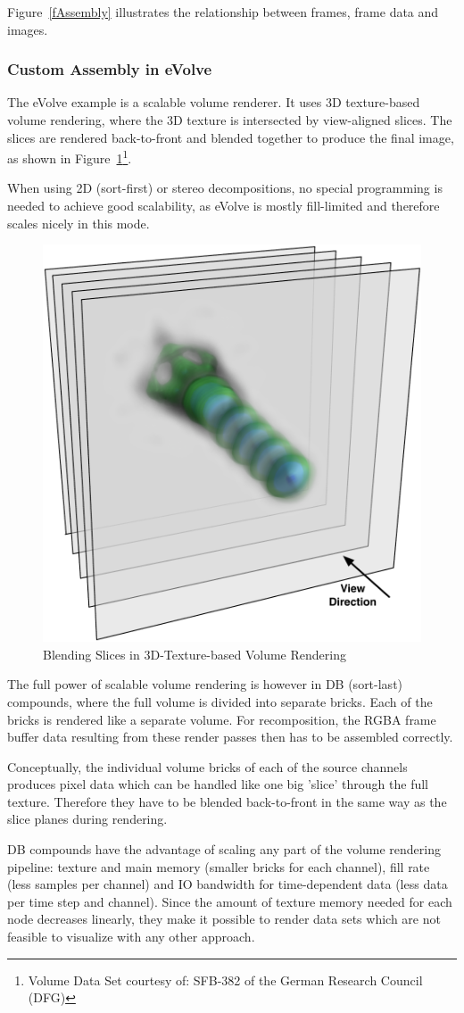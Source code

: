 \documentclass[10pt,a4]{scrartcl}
\newcommand{\fig}[1]{Figure~\ref{#1}}
\begin{document}
\fig{fAssembly} illustrates the relationship between frames, frame data
and images.

\subsubsection{Custom Assembly in eVolve}

The \textsf{eVolve} example is a scalable volume renderer. It uses 3D
texture-based volume rendering, where the 3D texture is intersected by
view-aligned slices. The slices are rendered back-to-front and blended
together to produce the final image, as shown in
\fig{fSlices}\footnote{Volume Data Set courtesy of: SFB-382 of the German
  Research Council (DFG)}.

When using 2D (sort-first) or stereo decompositions, no special
programming is needed to achieve good scalability, as \textsf{eVolve} is
mostly fill-limited and therefore scales nicely in this mode. 

\begin{figure}
  \includegraphics[width=.382\textwidth]{images/slices.pdf}
  {\caption{\small\label{fSlices}Blending Slices in 3D-Texture-based
      Volume Rendering}}
\end{figure}
The full power of scalable volume rendering is however in DB (sort-last)
compounds, where the full volume is divided into separate bricks. Each
of the bricks is rendered like a separate volume. For recomposition, the
\textsf{RGBA} frame buffer data resulting from these render passes then
has to be assembled correctly. 

Conceptually, the individual volume bricks of each of the source
channels produces pixel data which can be handled like one big 'slice'
through the full texture. Therefore they have to be blen\-ded
back-to-front in the same way as the slice planes during rendering.

DB compounds have the advantage of scaling any part of the volume
rendering pipeline: texture and main memory (smaller bricks for each
channel), fill rate (less samples per channel) and IO bandwidth for
time-dependent data (less data per time step and channel). Since the
amount of texture memory needed for each node decreases linearly, they
make it possible to render data sets which are not feasible to
visualize with any other approach.
\end{document}
